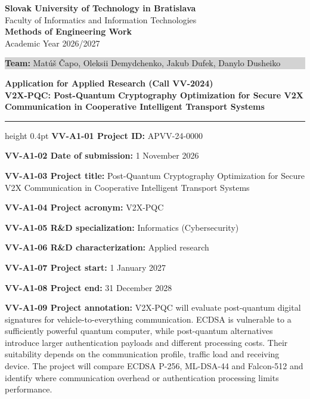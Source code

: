 \documentclass[10pt,a4paper]{article}
\newcommand{\bigsec}[1]{\par\needspace{4\baselineskip}\vspace{9pt}\noindent{\Large\sffamily\bfseries\color{navy}#1}\par\vspace{2pt}\hrule height 0.4pt\color{black}\vspace{5pt}}
\begin{document}
\begin{center}
{\Large\bfseries Slovak University of Technology in Bratislava}\\[2pt]
{\large Faculty of Informatics and Information Technologies}\\[15pt]
{\LARGE\bfseries\color{primary} Methods of Engineering Work}\\[4pt]
{\large Academic Year 2026/2027}
\end{center}
\vspace{10pt}
\begin{center}
\colorbox{lightgray}{\parbox{0.92\linewidth}{\vspace{7pt}\textbf{Team:} Mat\'u\v{s} \v{C}apo, Oleksii Demydchenko, Jakub Dufek, Danylo Dusheiko\vspace{7pt}}}
\end{center}
\vspace{17pt}
\begin{center}
{\Large\bfseries Application for Applied Research (Call VV-2024)}\\[7pt]
{\large\color{primary}\bfseries V2X-PQC: Post-Quantum Cryptography Optimization for Secure V2X Communication in Cooperative Intelligent Transport Systems}
\end{center}
\vspace{12pt}
\bigsec{VV-A Project identification}
\noindent\textbf{VV-A1-01 Project ID:} APVV-24-0000\par
\noindent\textbf{VV-A1-02 Date of submission:} 1 November 2026\par
\noindent\textbf{VV-A1-03 Project title:} Post-Quantum Cryptography Optimization for Secure V2X Communication in Cooperative Intelligent Transport Systems\par
\noindent\textbf{VV-A1-04 Project acronym:} V2X-PQC\par
\noindent\textbf{VV-A1-05 R\&D specialization:} Informatics (Cybersecurity)\par
\noindent\textbf{VV-A1-06 R\&D characterization:} Applied research\par
\noindent\textbf{VV-A1-07 Project start:} 1 January 2027\par
\noindent\textbf{VV-A1-08 Project end:} 31 December 2028\par
\noindent\textbf{VV-A1-09 Project annotation:}
V2X-PQC will evaluate post-quantum digital signatures for vehicle-to-everything communication. ECDSA is vulnerable to a sufficiently powerful quantum computer, while post-quantum alternatives introduce larger authentication payloads and different processing costs. Their suitability depends on the communication profile, traffic load and receiving device. The project will compare ECDSA P-256, ML-DSA-44 and Falcon-512 and identify where communication overhead or authentication processing limits performance.\par
\end{document}

